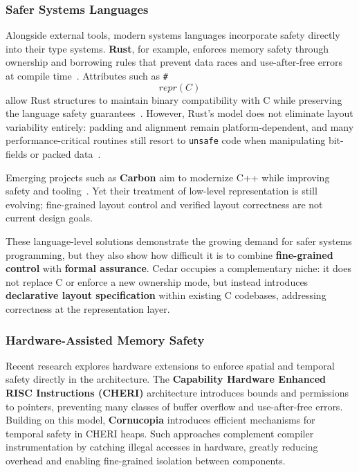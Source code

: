 \subsubsection{Safer Systems Languages}
Alongside external tools, modern systems languages incorporate
safety directly into their type systems. \textbf{Rust}, for
example, enforces memory safety through ownership and borrowing rules
that prevent data races and use-after-free errors at
compile time~\autocite{Rust_lang,Rust_systems}. Attributes
such as \texttt{\#\[repr(C)\]} allow Rust structures to
maintain binary compatibility with C while preserving the language
safety guarantees~\autocite{rust_repr}. However, Rust's model does not
eliminate layout variability entirely: padding and alignment remain 
platform-dependent, and many performance-critical routines still
resort to \texttt{unsafe} code when manipulating bit-fields or
packed data~\autocite{unsafe_rust}.

Emerging projects such as \textbf{Carbon} aim to modernize C++ while
improving safety and tooling~\autocite{carbon_cpp_safety}. Yet their
treatment of low-level representation is still evolving;
fine-grained layout control and verified layout correctness are not
current design goals.

These language-level solutions demonstrate the growing demand
for safer systems programming, but they also show
how difficult it is to combine \textbf{fine-grained control} with
\textbf{formal assurance}. Cedar occupies a complementary niche: it does
not replace C or enforce a new ownership mode, but instead
introduces \textbf{declarative layout specification} within existing
C codebases, addressing correctness at the representation layer. 

\subsubsection{Hardware-Assisted Memory Safety}
Recent research explores hardware extensions to enforce spatial and temporal
safety directly in the architecture. The \textbf{Capability Hardware
Enhanced RISC Instructions (CHERI)} architecture introduces
bounds and permissions to pointers, preventing many classes of buffer overflow
and use-after-free errors\autocite{filardo2020cornucopia}. Building on
this model, \textbf{Cornucopia} introduces efficient mechanisms for temporal
safety in CHERI heaps. Such approaches complement compiler instrumentation
by catching illegal accesses in hardware, greatly reducing overhead and enabling
fine-grained isolation between components.

